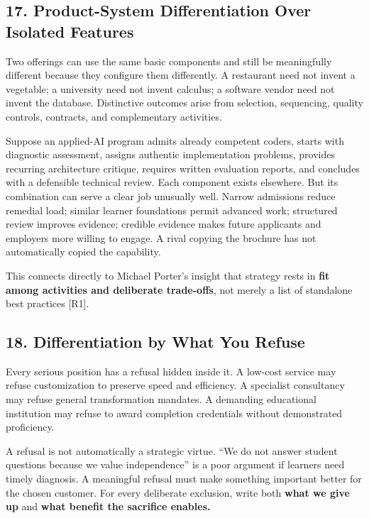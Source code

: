 \subsection*{17. Product-System Differentiation Over Isolated Features}

Two offerings can use the same basic components and still be meaningfully different because they configure them differently. A restaurant need not invent a vegetable; a university need not invent calculus; a software vendor need not invent the database. Distinctive outcomes arise from selection, sequencing, quality controls, contracts, and complementary activities.

Suppose an applied-AI program admits already competent coders, starts with diagnostic assessment, assigns authentic implementation problems, provides recurring architecture critique, requires written evaluation reports, and concludes with a defensible technical review. Each component exists elsewhere. But its combination can serve a clear job unusually well. Narrow admissions reduce remedial load; similar learner foundations permit advanced work; structured review improves evidence; credible evidence makes future applicants and employers more willing to engage. A rival copying the brochure has not automatically copied the capability.

This connects directly to Michael Porter's insight that strategy rests in \textbf{fit among activities and deliberate trade-offs}, not merely a list of standalone best practices [R1].

\subsection*{18. Differentiation by What You Refuse}

Every serious position has a refusal hidden inside it. A low-cost service may refuse customization to preserve speed and efficiency. A specialist consultancy may refuse general transformation mandates. A demanding educational institution may refuse to award completion credentials without demonstrated proficiency.

A refusal is not automatically a strategic virtue. ``We do not answer student questions because we value independence'' is a poor argument if learners need timely diagnosis. A meaningful refusal must make something important better for the chosen customer. For every deliberate exclusion, write both \textbf{what we give up} and \textbf{what benefit the sacrifice enables.}

